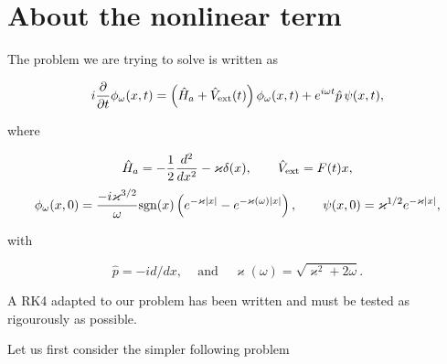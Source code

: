 \documentclass[10pt]{article}
\begin{document}
\section*{About the nonlinear term}
The problem we are trying to solve is written as \cite{yangaliev2020}

\begin{equation}
	i\frac{\partial}{\partial t}\phi_\omega(x,t)
	   = \left( \hat{H}_a + \hat{V}_{\rm ext}(t)\right) 
	   \phi_\omega (x,t)
 	   + e^{i\omega t} {\hat{p}}\,
	   \psi(x,t), \label{eqn:main_1d}
\end{equation}


where

\begin{equation}
  \hat{H}_a = -\frac{1}{2}\frac{d^2}{dx^2} - \varkappa\delta(x), 
\hspace{20pt}  \hat{V}_{\rm ext} = F(t)x,
\end{equation}
\begin{equation}
  \phi_\omega (x,0) = \frac{-i\varkappa^{3/2}}{\omega}
{\rm sgn}(x)\left(e^{-\varkappa|x|} - e^{-\varkappa(\omega)|x|}\right), 
\hspace{20pt}  \psi(x,0) = \varkappa^{1/2}e^{-\varkappa|x|}, 
\label{eqn:bound_state}
\end{equation}

with

\begin{equation}
  \hat{p} = -id/dx,\hspace{10pt} \mbox{ and } 
  \hspace{10pt} \varkappa(\omega) = \sqrt{\varkappa^2 + 2\omega}.
\end{equation}

\hspace{10pt}

A RK4 adapted to our problem has been written and must be tested as 
rigourously as possible.


Let us first consider the simpler following problem
\end{document}
